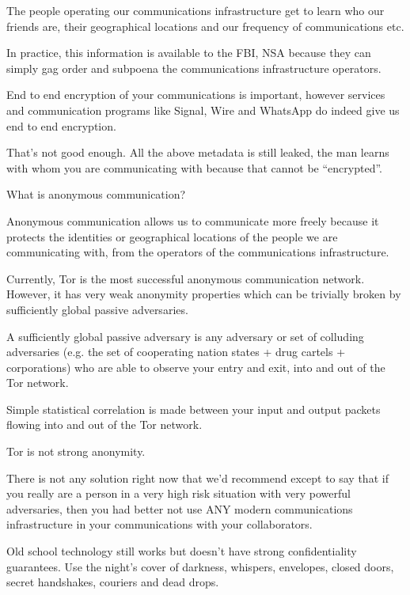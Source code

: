 \documentclass[statementpaper,oneside,article,14pt]{memoir}
\begin{document}
\newpage

The people operating our communications infrastructure
get to learn who our friends are, their geographical locations and
our frequency of communications etc.

In practice, this information is available to the FBI, NSA because they
can simply gag order and subpoena the communications infrastructure operators.

End to end encryption of your communications is important, however
services and communication programs like Signal, Wire and WhatsApp do
indeed give us end to end encryption.

That's not good enough. All the above metadata is still leaked, the man learns
with whom you are communicating with because that cannot be ``encrypted''.

\newpage

What is anonymous communication?

Anonymous communication allows us to communicate more freely because
it protects the identities or geographical locations of the people we
are communicating with, from the operators of the communications
infrastructure.

Currently, Tor is the most successful anonymous communication network.
However, it has very weak anonymity properties which can be trivially
broken by sufficiently global passive adversaries.

A sufficiently global passive adversary is any adversary or set of colluding
adversaries (e.g. the set of cooperating nation states + drug cartels + corporations)
who are able to observe your entry and exit, into and out of the Tor network.

Simple statistical correlation is made between your input and output packets flowing
into and out of the Tor network.

Tor is not strong anonymity.

\newpage

There is not any solution right now that we'd recommend except to say
that if you really are a person in a very high risk situation with
very powerful adversaries, then you had better not use ANY modern
communications infrastructure in your communications with your
collaborators.

Old school technology still works but doesn't have strong
confidentiality guarantees. Use the night's cover of darkness,
whispers, envelopes, closed doors, secret handshakes,
couriers and dead drops.

\newpage
\end{document}
